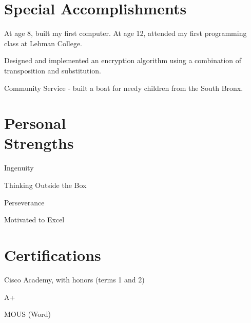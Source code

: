 \documentclass[margin,line]{resume}
\begin{document}
\begin{resume}
\section{\mysidestyle Special Accomplishments}
	\begin{asparablank}
		\item At age 8, built my first computer. At age 12, attended my first
		programming class at Lehman College.
		\item Designed and implemented an encryption algorithm using a
		combination of transposition and substitution.
		\item Community Service - built a boat for needy children from the South
		Bronx.
	\end{asparablank}

\section{\mysidestyle Personal \\ Strengths}
	\begin{asparablank}
		\item Ingenuity
		\item Thinking Outside the Box
		\item Perseverance
		\item Motivated to Excel
	\end{asparablank}

\section{\mysidestyle Certifications}
	\begin{asparablank}
		\item Cisco Academy, with honors (terms 1 and 2)
		\item A+
		\item MOUS (Word)
	\end{asparablank}

\end{resume}
\pagebreak[4] %

\end{document}
